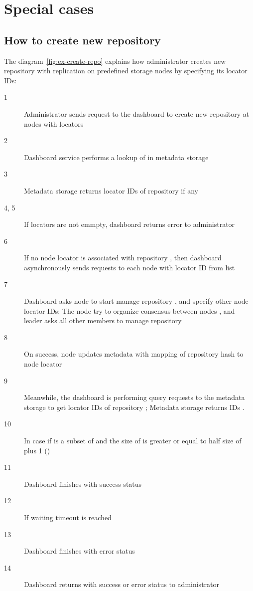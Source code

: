 \section{Special cases}\label{sec:explanation}

\subsection{How to create new repository}

The diagram~\ref{fig:ex-create-repo} explains how administrator creates new repository with replication
on predefined storage nodes by specifying its locator IDs:
\begin{description}
  \item[1] Administrator sends request to the dashboard to create new repository  at nodes with locators
  \item[2] Dashboard service performs a lookup of  in metadata storage
  \item[3] Metadata storage returns locator IDs  of  repository if any
  \item[4, 5] If  locators are not emmpty, dashboard returns error to administrator
  \item[6] If no node locator is associated with repository , then dashboard asynchronously sends
    requests to each node with locator ID  from list 
  \item[7] Dashboard asks node  to start manage repository , and specify other node locator IDs;
    The node  try to organize consensus between nodes , and leader asks all other members
    to manage repository 
  \item[8] On success, node  updates metadata with mapping of repository  hash to
    node locator 
  \item[9] Meanwhile, the dashboard is performing query requests to the metadata storage to get locator IDs of
    repository ; Metadata storage returns IDs .
  \item[10] In case if  is a subset of  and the size of  is greater or equal to
    half size of  plus 1 ()
  \item[11] Dashboard finishes with success status
  \item[12] If waiting timeout is reached
  \item[13] Dashboard finishes with error status
  \item[14] Dashboard returns with success or error status to administrator

\end{description}
